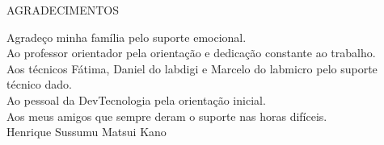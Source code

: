 \begin{titlepage}

\begin{center}
\large
AGRADECIMENTOS
\end{center}

\vspace{10mm}
\large
Agradeço minha família pelo suporte emocional.\\
Ao professor orientador pela orientação e dedicação constante ao trabalho.\\
Aos técnicos Fátima, Daniel do labdigi e Marcelo do labmicro pelo suporte técnico dado.\\
Ao pessoal da DevTecnologia pela orientação inicial.\\
Aos meus amigos que sempre deram o suporte nas horas difíceis.\\

\vfill
Henrique Sussumu Matsui Kano
\end{titlepage}
